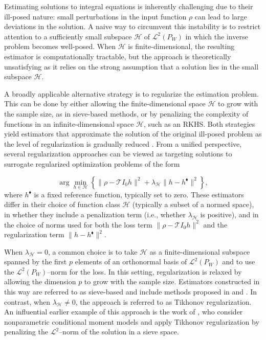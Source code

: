 \documentclass[twoside,11pt]{article}
\newcommand{\mc}{\mathcal}
\begin{document}
Estimating solutions to integral equations is inherently challenging due to their ill-posed nature: small perturbations in the input function $\rho$ can lead to large deviations in the solution. A naive way to circumvent this instability is to restrict attention to a sufficiently small subspace $\mathcal{H}$ of $\mathcal{L}^2(P_W)$ in which the inverse problem becomes well-posed. When $\mathcal{H}$ is finite-dimensional, the resulting estimator is computationally tractable, but the approach is theoretically unsatisfying as it relies on the strong assumption that a solution lies in the small subspace $\mc{H}$. 

A broadly applicable alternative strategy is to regularize the estimation problem. This can be done by either allowing the finite-dimensional space $\mathcal{H}$ to grow with the sample size, as in sieve-based methods, or by penalizing the complexity of functions in an infinite-dimensional space $\mathcal{H}$, such as an RKHS. Both strategies yield estimators that approximate the solution of the original ill-posed problem as the level of regularization is gradually reduced \citep{carrasco2007linear, cavalier2011inverse}. From a unified perspective, several regularization approaches can be viewed as targeting solutions to surrogate regularized optimization problems of the form

\begin{equation}
    \arg\min_{h \in \mathcal{H}} \left\{ \| \rho - \mc{T} I_0h \|^2 + \lambda_{\mc{H}} \| h-h^\blacklozenge \|^2 \right\},\label{eq:regularized_problem}
\end{equation}
where $h^\blacklozenge$ is a fixed reference function, typically set to zero. These estimators differ in their choice of function class $\mathcal{H}$ (typically a subset of a normed space), in whether they include a penalization term (i.e., whether $\lambda_{\mathcal{H}}$ is positive), and in the choice of norms used for both the loss term $\| \rho - \mc{T} I_0h \|^2$ and the regularization term $\| h -h^\blacklozenge \|^2$.

When $\lambda_{\mathcal{H}} = 0$, a common choice is to take $\mathcal{H}$ as a finite-dimensional subspace spanned by the first $p$ elements of an orthonormal basis of $\mathcal{L}^2(P_W)$ and to use the $\mathcal{L}^2(P_W)$--norm for the loss. In this setting, regularization is relaxed by allowing the dimension $p$ to grow with the sample size. Estimators constructed in this way are referred to as sieve-based and include methods proposed in \citet{newey2003instrumental} and \citet{ai2003efficient, ai2007estimation}. In contrast, when $\lambda_{\mathcal{H}} \neq 0$, the approach is referred to as Tikhonov regularization. An influential earlier example of this approach is the work of \citet{chen2012estimation}, who consider nonparametric conditional moment models and apply Tikhonov regularization by penalizing the $\mathcal{L}^2$--norm of the solution in a sieve space.
 
\end{document}
